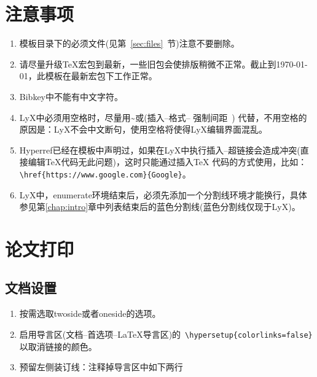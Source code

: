 \documentclass[twoside,longtitle]{LZUthesis}
\begin{document}
\section{注意事项}
\begin{enumerate}
\item 模板目录下的必须文件(见第~\ref{sec:files}~节)注意不要删除。
\item 请尽量升级\TeX{}宏包到最新，一些旧包会使排版稍微不正常。截止到\today ，此模板在最新宏包下工作正常。
\item Bibkey中不能有中文字符。
\item LyX中必须用空格时，尽量用\textasciitilde{}或(插入--格式-- 强制间距~) 代替，不用空格的原因是：LyX不会中文断句，使用空格将使得LyX编辑界面混乱。
\item Hyperref已经在模板中声明过，如果在LyX中执行插入--超链接会造成冲突(直接编辑\TeX{}代码无此问题)，这时只能通过插入\TeX{} 代码的方式使用，比如：\lstinline!\href{https://www.google.com}{Google}!。
\item LyX中，enumerate环境结束后，必须先添加一个分割线环境才能换行，具体参见第\ref{chap:intro}章中列表结束后的蓝色分割线(蓝色分割线仅现于LyX)。
\end{enumerate}

\section{论文打印}


\subsection{文档设置}
\begin{enumerate}
\item 按需选取twoside或者oneside的选项。
\item 启用导言区(文档--首选项--\LaTeX{}导言区)的~\lstinline!\hypersetup{colorlinks=false}!以取消链接的颜色。
\item 预留左侧装订线：注释掉导言区中如下两行



\end{enumerate}
\end{document}
